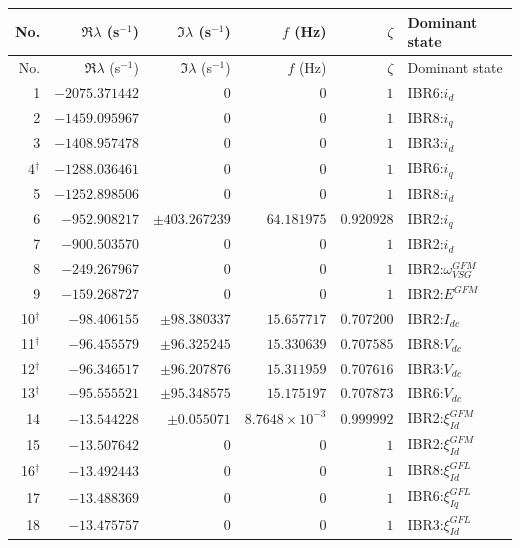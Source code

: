 \begingroup\footnotesize\setlength{\tabcolsep}{3pt}
\begin{longtable}{@{}r r r r r l@{}}
\toprule
No. & $\Re\lambda$ (s$^{-1}$) & $\Im\lambda$ (s$^{-1}$) & $f$ (Hz) & $\zeta$ & Dominant state \\ \midrule
\endfirsthead
\toprule
No. & $\Re\lambda$ (s$^{-1}$) & $\Im\lambda$ (s$^{-1}$) & $f$ (Hz) & $\zeta$ & Dominant state \\ \midrule
\endhead
1 & $-2075.371442$ & $0$ & $0$ & $1$ & IBR6:$i_d$ \\ 
2 & $-1459.095967$ & $0$ & $0$ & $1$ & IBR8:$i_q$ \\ 
3 & $-1408.957478$ & $0$ & $0$ & $1$ & IBR3:$i_d$ \\ 
4$^{\dagger}$ & $-1288.036461$ & $0$ & $0$ & $1$ & IBR6:$i_q$ \\ 
5 & $-1252.898506$ & $0$ & $0$ & $1$ & IBR8:$i_d$ \\ 
6 & $-952.908217$ & $\pm403.267239$ & $64.181975$ & $0.920928$ & IBR2:$i_q$ \\ 
7 & $-900.503570$ & $0$ & $0$ & $1$ & IBR2:$i_d$ \\ 
8 & $-249.267967$ & $0$ & $0$ & $1$ & IBR2:$\omega_{VSG}^{GFM}$ \\ 
9 & $-159.268727$ & $0$ & $0$ & $1$ & IBR2:$E^{GFM}$ \\ 
10$^{\dagger}$ & $-98.406155$ & $\pm98.380337$ & $15.657717$ & $0.707200$ & IBR2:$I_{dc}$ \\ 
11$^{\dagger}$ & $-96.455579$ & $\pm96.325245$ & $15.330639$ & $0.707585$ & IBR8:$V_{dc}$ \\ 
12$^{\dagger}$ & $-96.346517$ & $\pm96.207876$ & $15.311959$ & $0.707616$ & IBR3:$V_{dc}$ \\ 
13$^{\dagger}$ & $-95.555521$ & $\pm95.348575$ & $15.175197$ & $0.707873$ & IBR6:$V_{dc}$ \\ 
14 & $-13.544228$ & $\pm0.055071$ & $8.7648\times10^{-3}$ & $0.999992$ & IBR2:$\xi_{Id}^{GFM}$ \\ 
15 & $-13.507642$ & $0$ & $0$ & $1$ & IBR2:$\xi_{Id}^{GFM}$ \\ 
16$^{\dagger}$ & $-13.492443$ & $0$ & $0$ & $1$ & IBR8:$\xi_{Id}^{GFL}$ \\ 
17 & $-13.488369$ & $0$ & $0$ & $1$ & IBR6:$\xi_{Iq}^{GFL}$ \\ 
18 & $-13.475757$ & $0$ & $0$ & $1$ & IBR3:$\xi_{Id}^{GFL}$ \\ 

\end{longtable}
